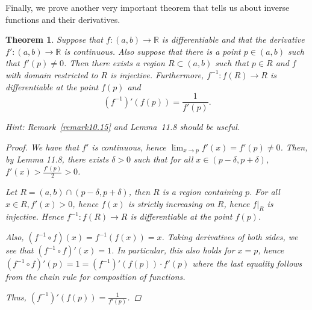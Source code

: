\documentclass[11pt]{article}
\newcommand{\bbR}{\mathbb{R}}
\renewcommand{\_}[1]{\underline{ #1 }}
\newtheorem{theorem}{Theorem}[section]
\theoremstyle{definition}
\numberwithin{equation}{subsection}
\begin{document}
Finally, we prove another very important theorem that tells us about inverse functions and their derivatives. 

\begin{theorem}\label{IFT}
Suppose that $f:(a,b)\to\bbR$ is differentiable and that the derivative $f':(a,b)\to\bbR$ is continuous. Also suppose that there is a point $p\in(a,b)$ such that $f'(p)\neq 0$. 
Then there exists a region $R\subset (a,b)$ such that $p\in R$ and $f$ with domain restricted to $R$ is injective. 
Furthermore, $f^{-1}:f(R)\to R$ is differentiable at the point $f(p)$ and
$$ (f^{-1})'(f(p))=\frac{1}{f'(p)} .$$



{\em Hint:} Remark~\ref{remark10.15} and Lemma~11.8 should be useful.\medskip

\begin{proof}
We have that $f'$ is continuous, hence $\lim_{x\to p}f'(x)=f'(p)\neq 0$. Then, by Lemma 11.8, there exists $\delta>0$ such that for all $x\in (p-\delta, p+\delta)$, $f'(x)>\frac{f'(p)}{2}>0$. 

Let $R=(a,b)\cap (p-\delta, p+\delta)$, then $R$ is a region containing $p$. For all $x\in R, f'(x)>0$, hence $f(x)$ is strictly increasing on $R$, hence $f|_{R}$ is injective. Hence $f^{-1}: f(R)\rightarrow R$ is differentiable at the point $f(p)$.

Also, $(f^{-1}\circ f)(x)=f^{-1}(f(x))=x$. Taking derivatives of both sides, we see that $(f^{-1}\circ f)'(x)=1$. In particular, this also holds for $x=p$, hence $(f^{-1}\circ f)'(p)=1=(f^{-1})'(f(p))\cdot f'(p)$ where the last equality follows from the chain rule for composition of functions.

Thus, $(f^{-1})'(f(p)) = \frac{1}{f'(p)}$.

\renewcommand\qedsymbol{QED}
\end{proof}


\end{theorem} 
\end{document}
